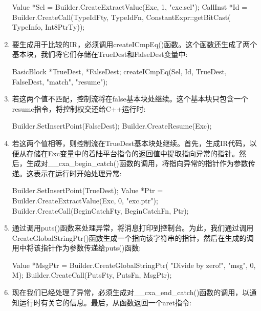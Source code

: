 \begin{enumerate}
\begin{cpp}
    Value *Sel =
        Builder.CreateExtractValue(Exc, {1}, "exc.sel");
    CallInst *Id =
        Builder.CreateCall(TypeIdFty, TypeIdFn,
                            {ConstantExpr::getBitCast(
                                TypeInfo, Int8PtrTy)});
\end{cpp}

\item
要生成用于比较的IR，必须调用createICmpEq()函数。这个函数还生成了两个基本块，我们将它们存储在TrueDest和FalseDest变量中:

\begin{cpp}
    BasicBlock *TrueDest, *FalseDest;
    createICmpEq(Sel, Id, TrueDest, FalseDest, "match",
                "resume");
\end{cpp}

\item
若这两个值不匹配，控制流将在false基本块处继续。这个基本块只包含一个resume指令，将控制权交还给C++运行时:

\begin{cpp}
    Builder.SetInsertPoint(FalseDest);
    Builder.CreateResume(Exc);
\end{cpp}

\item
若这两个值相等，则控制流在TrueDest基本块处继续。首先，生成IR代码，以便从存储在Exc变量中的着陆平台指令的返回值中提取指向异常的指针。然后，生成对\_\_cxa\_begin\_catch()函数的调用，将指向异常的指针作为参数传递。这表示在运行时开始处理异常:

\begin{cpp}
    Builder.SetInsertPoint(TrueDest);
    Value *Ptr =
        Builder.CreateExtractValue(Exc, {0}, "exc.ptr");
    Builder.CreateCall(BeginCatchFty, BeginCatchFn,
                        {Ptr});
\end{cpp}

\item
通过调用puts()函数来处理异常，将消息打印到控制台。为此，我们通过调用CreateGlobalStringPtr()函数生成一个指向该字符串的指针，然后在生成的调用中将该指针作为参数传递给puts()函数:

\begin{cpp}
    Value *MsgPtr = Builder.CreateGlobalStringPtr(
        "Divide by zero!", "msg", 0, M);
    Builder.CreateCall(PutsFty, PutsFn, {MsgPtr});
\end{cpp}

\item
现在我们已经处理了异常，必须生成对\_\_cxa\_end\_catch()函数的调用，以通知运行时有关它的信息。最后，从函数返回一个aret指令:

\begin{cpp}
    Builder.CreateCall(EndCatchFty, EndCatchFn);
    Builder.CreateRet(Int32Zero);
}
\end{cpp}

\end{enumerate}

